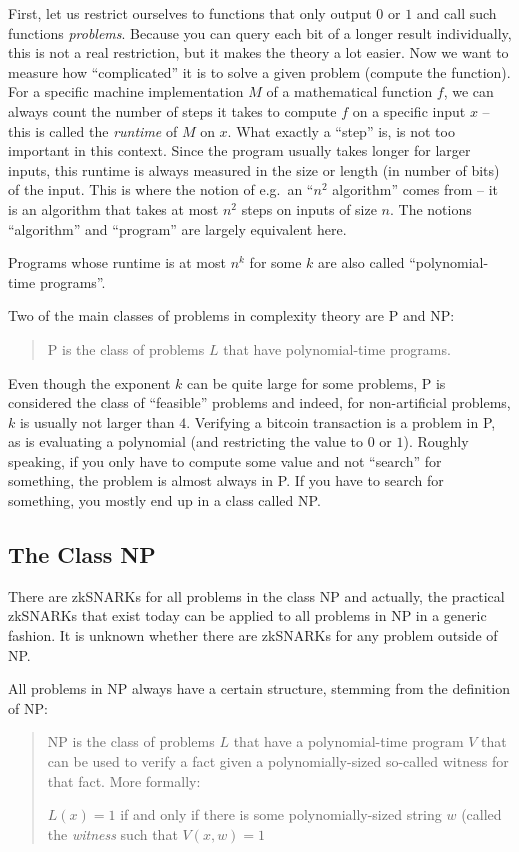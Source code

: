 \documentclass[11pt,letterpaper]{article}
\begin{document}
First, let us restrict ourselves to functions that only output $0$ or $1$ and call such functions \textit{problems}. Because you can query each bit of a longer result individually, this is not a real restriction, but it makes the theory a lot easier. Now we want to measure how ``complicated'' it is to solve a given problem (compute the function). For a specific machine implementation $M$ of a mathematical function $f$, we can always count the number of steps it takes to compute $f$ on a specific input $x$ -- this is called the \textit{runtime} of $M$ on $x$. What exactly a ``step'' is, is not too important in this context. Since the program usually takes longer for larger inputs, this runtime is always measured in the size or length (in number of bits) of the input. This is where the notion of e.g.\ an ``$n^{2}$ algorithm''  comes from -- it is an algorithm that takes at most $n^{2}$ steps on inputs of size $n$. The notions ``algorithm'' and ``program'' are largely equivalent here.


Programs whose runtime is at most $n^{k}$ for some $k$ are also called ``polynomial-time programs''.

Two of the main classes of problems in complexity theory are P and NP:
\begin{quote}P is the class of problems $L$ that have polynomial-time programs.\end{quote}

Even though the exponent $k$ can be quite large for some problems, P is considered the class of ``feasible'' problems and indeed, for non-artificial problems, $k$ is usually not larger than $4$. Verifying a bitcoin transaction is a problem in P, as is evaluating a polynomial (and restricting the value to $0$ or $1$). Roughly speaking, if you only have to compute some value and not ``search'' for something, the problem is almost always in P. If you have to search for something, you mostly end up in a class called NP.

\subsection{The Class NP}


There are zkSNARKs for all problems in the class NP and actually, the practical zkSNARKs that exist today can be applied to all problems in NP in a generic fashion. It is unknown whether there are zkSNARKs for any problem outside of NP.


All problems in NP always have a certain structure, stemming from the definition of NP:
\begin{quote}
NP is the class of problems $L$ that have a polynomial-time program $V$ that can be used to verify a fact given a polynomially-sized so-called witness for that fact. More formally:

$L(x) = 1$ if and only if there is some polynomially-sized string $w$ (called the \textit{witness} such that $V(x, w) = 1$
\end{quote}
\end{document}
